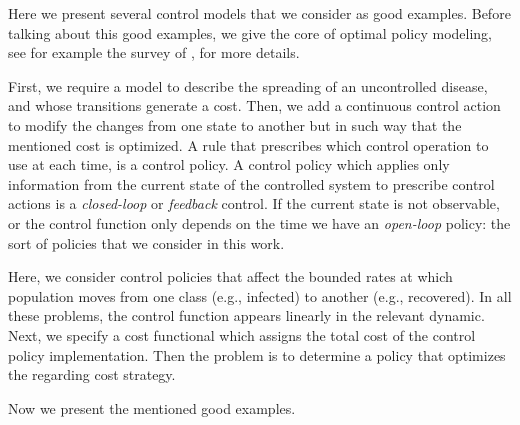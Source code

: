   Here we present  several control models that we consider as good 
examples. Before talking about this good examples, we give the core of optimal 
policy modeling, see for example the survey of \citet{Wickwire1977}, for more
details.

  First, we require a model to describe the spreading of an uncontrolled
disease, and whose transitions generate a cost. Then, we add a continuous
control action to modify the changes from one state to another but in such way
that the mentioned cost is optimized. A rule that prescribes which control
operation to use at each time, is a control policy. A control policy which
applies only information from the current state of the controlled system to
prescribe control actions is a \emph{closed-loop} or \emph{feedback} control.
If the current state is not observable, or the control function only depends 
on the time we have an \emph{open-loop} policy: the sort of policies that we 
consider in this work.

  Here, we consider control policies that affect the bounded rates at which
population moves from one class (e.g., infected) to another (e.g., recovered).
In all these problems, the control function appears linearly in the relevant
dynamic. Next, we specify a cost functional which assigns the total cost of the
control policy implementation. Then the problem is to determine a policy that
optimizes the regarding cost strategy.

  Now we present the mentioned good examples.
